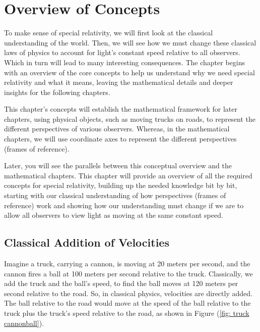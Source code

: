 \mainmatter
\chapter{Overview of Concepts} \label{ch: Conceptual Overview}

To make sense of special relativity, we will first look at the classical understanding of the world.
Then, we will see how we must change these classical laws of physics to account for light's constant speed relative to all observers.
Which in turn will lead to many interesting consequences.
The chapter begins with an overview of the core concepts to help us understand why we need special relativity and what it means, leaving the mathematical details and deeper insights for the following chapters.

This chapter's concepts will establish the mathematical framework for later chapters, using physical objects, such as moving trucks on roads, to represent the different perspectives of various observers.
Whereas, in the mathematical chapters, we will use coordinate axes to represent the different perspectives (frames of reference).

Later, you will see the parallels between this conceptual overview and the mathematical chapters.
This chapter will provide an overview of all the required concepts for special relativity, building up the needed knowledge bit by bit, starting with our classical understanding of how perspectives (frames of reference) work and showing how our understanding must change if we are to allow all observers to view light as moving at the same constant speed.

\section{Classical Addition of Velocities} \label{sect: Classical Addition of Velocities}

Imagine a truck, carrying a cannon, is moving at 20 meters per second, and the cannon fires a ball at 100 meters per second relative to the truck.
Classically, we add the truck and the ball's speed, to find the ball moves at 120 meters per second relative to the road.
So, in classical physics, velocities are directly added.
The ball relative to the road would move at the speed of the ball relative to the truck plus the truck's speed relative to the road, as shown in Figure (\ref{fig: truck cannonball}).

